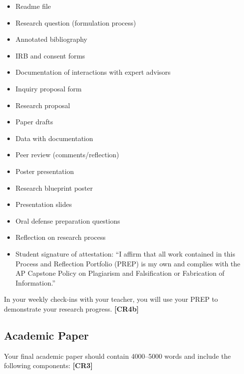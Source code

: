 \documentclass[11pt,]{article}
\providecommand{\tightlist}{%
  \setlength{\itemsep}{0pt}\setlength{\parskip}{0pt}}
\begin{document}
\begin{itemize}
\tightlist
\item
  Readme file
\item
  Research question (formulation process)
\item
  Annotated bibliography
\item
  IRB and consent forms
\item
  Documentation of interactions with expert advisors
\item
  Inquiry proposal form
\item
  Research proposal
\item
  Paper drafts
\item
  Data with documentation
\item
  Peer review (comments/reflection)
\item
  Poster presentation
\item
  Research blueprint poster
\item
  Presentation slides
\item
  Oral defense preparation questions
\item
  Reflection on research process
\item
  Student signature of attestation: ``I affirm that all work contained in this Process and Reflection Portfolio (PREP) is my own and complies with the AP Capstone Policy on Plagiarism and Falsification or Fabrication of Information.''
\end{itemize}

In your weekly check-ins with your teacher, you will use your PREP to demonstrate your research progress. \textbf{{[}CR4b{]}} 

\hypertarget{academic-paper}{%
\subsection{Academic Paper}\label{academic-paper}}

Your final academic paper should contain 4000--5000 words and include the following components: \textbf{{[}CR3{]}} 
\end{document}
